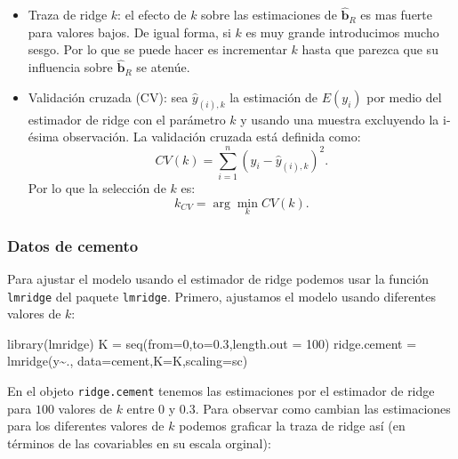 \documentclass[
]{article}
\newenvironment{Shaded}{\begin{snugshade}}{\end{snugshade}}
\newcommand{\AttributeTok}[1]{\textcolor[rgb]{0.77,0.63,0.00}{#1}}
\newcommand{\DecValTok}[1]{\textcolor[rgb]{0.00,0.00,0.81}{#1}}
\newcommand{\FloatTok}[1]{\textcolor[rgb]{0.00,0.00,0.81}{#1}}
\newcommand{\FunctionTok}[1]{\textcolor[rgb]{0.00,0.00,0.00}{#1}}
\newcommand{\NormalTok}[1]{#1}
\newcommand{\OtherTok}[1]{\textcolor[rgb]{0.56,0.35,0.01}{#1}}
\newcommand{\SpecialCharTok}[1]{\textcolor[rgb]{0.00,0.00,0.00}{#1}}
\newcommand{\StringTok}[1]{\textcolor[rgb]{0.31,0.60,0.02}{#1}}
\begin{document}
\begin{itemize}
\item
  Traza de ridge \(k\): el efecto de \(k\) sobre las estimaciones de \(\widehat{\boldsymbol b}_{R}\) es mas fuerte para valores bajos. De igual forma, si \(k\) es muy grande introducimos mucho sesgo. Por lo que se puede hacer es incrementar \(k\) hasta que parezca que su influencia sobre \(\widehat{\boldsymbol b}_{R}\) se atenúe.
\item
  Validación cruzada (CV): sea \(\widehat{y}_{(i),k}\) la estimación de \(E(y_i)\) por medio del estimador de ridge con el parámetro \(k\) y usando una muestra excluyendo la i-ésima observación. La validación cruzada está definida como:
  \[
  CV(k) = \sum_{i=1}^{n} (y_i - \widehat{y}_{(i),k})^2.
  \]
  Por lo que la selección de \(k\) es:
  \[
  k_{CV} = \arg \min_{k} CV(k).
  \]
\end{itemize}

\hypertarget{datos-de-cemento-1}{%
\subsubsection{Datos de cemento}\label{datos-de-cemento-1}}

Para ajustar el modelo usando el estimador de ridge podemos usar la función \texttt{lmridge} del paquete \texttt{lmridge}. Primero, ajustamos el modelo usando diferentes valores de \(k\):

\begin{Shaded}
\begin{Highlighting}[]
\FunctionTok{library}\NormalTok{(lmridge)}
\NormalTok{K }\OtherTok{=} \FunctionTok{seq}\NormalTok{(}\AttributeTok{from=}\DecValTok{0}\NormalTok{,}\AttributeTok{to=}\FloatTok{0.3}\NormalTok{,}\AttributeTok{length.out =} \DecValTok{100}\NormalTok{)}
\NormalTok{ridge.cement }\OtherTok{=} \FunctionTok{lmridge}\NormalTok{(y}\SpecialCharTok{\textasciitilde{}}\NormalTok{., }\AttributeTok{data=}\NormalTok{cement,}\AttributeTok{K=}\NormalTok{K,}\AttributeTok{scaling=}\StringTok{\textquotesingle{}sc\textquotesingle{}}\NormalTok{)}
\end{Highlighting}
\end{Shaded}

En el objeto \texttt{ridge.cement} tenemos las estimaciones por el estimador de ridge para \(100\) valores de \(k\) entre \(0\) y \(0.3\). Para observar como cambian las estimaciones para los diferentes valores de \(k\) podemos graficar la traza de ridge así (en términos de las covariables en su escala orginal):
\end{document}
